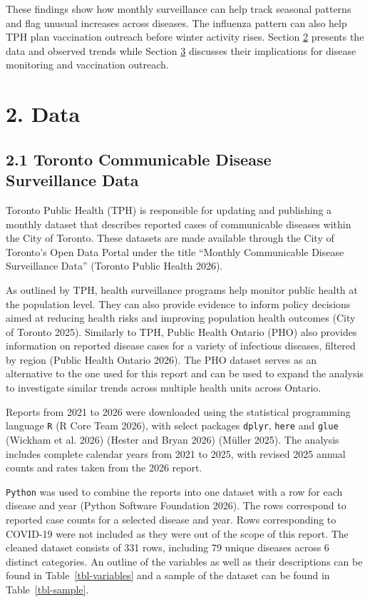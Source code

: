 \documentclass[
  letterpaper,
  DIV=11,
  numbers=noendperiod]{scrartcl}
\begin{document}
These findings show how monthly surveillance can help track seasonal
patterns and flag unusual increases across diseases. The influenza
pattern can also help TPH plan vaccination outreach before winter
activity rises. Section \hyperref[data]{2} presents the data and
observed trends while Section \hyperref[discussion]{3} discusses their
implications for disease monitoring and vaccination outreach.

\section{2. Data}\label{data}

\subsection{2.1 Toronto Communicable Disease Surveillance
Data}\label{toronto-communicable-disease-surveillance-data}

Toronto Public Health (TPH) is responsible for updating and publishing a
monthly dataset that describes reported cases of communicable diseases
within the City of Toronto. These datasets are made available through
the City of Toronto's Open Data Portal under the title ``Monthly
Communicable Disease Surveillance Data'' (Toronto Public Health 2026).

As outlined by TPH, health surveillance programs help monitor public
health at the population level. They can also provide evidence to inform
policy decisions aimed at reducing health risks and improving population
health outcomes (City of Toronto 2025). Similarly to TPH, Public Health
Ontario (PHO) also provides information on reported disease cases for a
variety of infectious diseases, filtered by region (Public Health
Ontario 2026). The PHO dataset serves as an alternative to the one used
for this report and can be used to expand the analysis to investigate
similar trends across multiple health units across Ontario.

Reports from 2021 to 2026 were downloaded using the statistical
programming language \texttt{R} (R Core Team 2026), with select packages
\texttt{dplyr}, \texttt{here} and \texttt{glue} (Wickham et al. 2026)
(Hester and Bryan 2026) (Müller 2025). The analysis includes complete
calendar years from 2021 to 2025, with revised 2025 annual counts and
rates taken from the 2026 report.

\texttt{Python} was used to combine the reports into one dataset with a
row for each disease and year (Python Software Foundation 2026). The
rows correspond to reported case counts for a selected disease and year.
Rows corresponding to COVID-19 were not included as they were out of the
scope of this report. The cleaned dataset consists of 331 rows,
including 79 unique diseases across 6 distinct categories. An outline of
the variables as well as their descriptions can be found in
Table~\ref{tbl-variables} and a sample of the dataset can be found in
Table~\ref{tbl-sample}.
\end{document}
